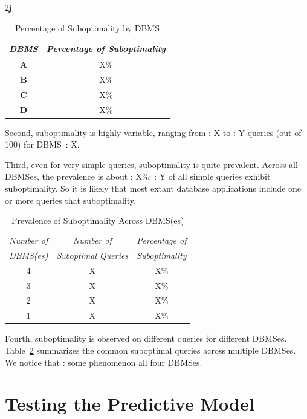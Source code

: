 \c2j{}{


\begin{table}[t]
\begin{center}
\begin{tabular}{c|c}
{\em DBMS} & {\em Percentage of Suboptimality}\\
\hline
{\bf A} & X\%\\
{\bf B} & X\%\\
{\bf C} & X\%\\
{\bf D} & X\%
\end{tabular}
\end{center}
\caption{Percentage of Suboptimality by DBMS\label{tab:dbmsprev}}
\end{table}

Second, suboptimality is highly variable, ranging from {\todo: X} to {\todo: Y}
queries (out of 100) for DBMS~{\todo: X}.

Third, even for very simple queries, suboptimality is quite prevalent.
Across all DBMSes, the prevalence is about {\todo: X}\%: {\todo: Y} of all
simple queries exhibit suboptimality. So it is likely that most extant
database applications include one or more queries that suboptimality.

\begin{table}
\begin{center}
\begin{tabular}{c|c|c}
{\em Number of} & {\em Number of} &{\em Percentage of}\\
{\em DBMS(es)} & {\em Suboptimal Queries} & {\em Suboptimality} \\
\hline
4 & X & X\% \\
3 & X & X\% \\
2 & X & X\% \\
1 & X & X\% \\
\end{tabular}
\end{center}
\caption{Prevalence of Suboptimality Across DBMS(es)\label{tab:supoptacross}}
\end{table}

Fourth, suboptimality is observed on different queries for different DBMSes.
Table~\ref{tab:supoptacross} 
summarizes the common suboptimal queries across multiple \hbox{DBMSes}.
We notice that {\todo: some phenomenon} 
all four \hbox{DBMSes}.
}

\section{Testing the Predictive Model}

